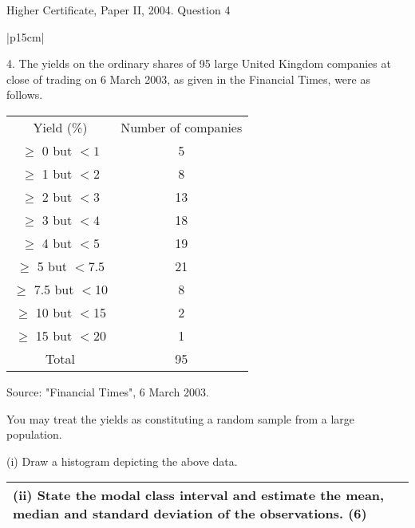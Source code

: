\documentclass[a4paper,12pt]{article}
\begin{document}
Higher Certificate, Paper II, 2004. Question 4

\begin{table}[ht!]
 
\centering
 
\begin{tabular}{|p{15cm}|}
 
\hline  

4. The yields on the ordinary shares of 95 large United Kingdom companies at close of trading on 6 March 2003, as given in the Financial Times, were as follows. 

\begin{center}
\begin{tabular}{|c|c|} 
Yield (\%)    & Number of companies  \\
$\geq$ 0 but $<1$  &  5  \\
$\geq$ 1 but $<2$  &  8  \\
$\geq$ 2 but $<3$  &  13  \\
$\geq$ 3 but $<4$ & 18  \\
$\geq$ 4 but $<5$  & 19   \\  
$\geq$ 5 but $<7.5$ &  21 \\
$\geq$ 7.5 but $<$10  &  8  \\
$\geq$ 10 but $<$15  &  2  \\
$\geq$ 15 but $<$20  &  1 \\
Total & 95 \\ 
\end{tabular}
\end{center}
           Source:  "Financial Times", 6 March 2003. 
 
You may treat the yields as constituting a random sample from a large population. 
 
(i) Draw a histogram depicting the above data. 
\\ \hline
  
\end{tabular}

\end{table} 



\begin{table}[ht!]
 
\centering
 
\begin{tabular}{|p{15cm}|}
 
(ii) State the modal class interval and estimate the mean, median and standard deviation of the observations. (6) 
 
\\ \hline
  
\end{tabular}

\end{table} 
\end{document}
